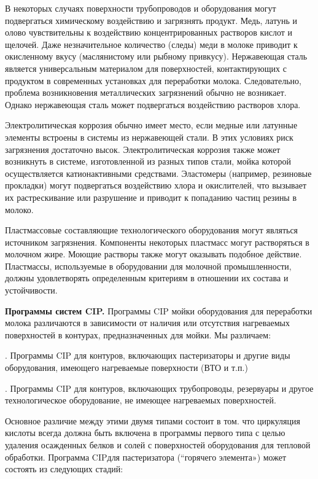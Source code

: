 {\par \redline В некоторых случаях поверхности трубопроводов и оборудования могут подвергаться химическому воздействию и загрязнять продукт. Медь, латунь и олово чувствительны к воздействию концентрированных растворов кислот и щелочей. Даже незначительное количество (следы) меди в молоке приводит к окисленному вкусу (маслянистому или рыбному привкусу). Нержавеющая сталь является универсальным материалом для поверхностей, контактирующих с продуктом в современных установках для переработки молока. Следовательно, проблема возникновения металлических загрязнений обычно не возникает. Однако нержавеющая сталь может подвергаться воздействию растворов хлора.

\par \redline Электролитическая коррозия обычно имеет место, если медные или латунные элементы встроены в системы из нержавеющей стали. В этих условиях риск загрязнения достаточно высок. Электролитическая коррозия также может возникнуть в системе, изготовленной из разных типов стали, мойка которой осуществляется катионактивными средствами. Эластомеры (например, резиновые прокладки) могут подвергаться воздействию хлора и окислителей, что вызывает их растрескивание или разрушение и приводит к попаданию частиц резины в молоко.



\par \redline Пластмассовые составляющие технологического оборудования могут являться источником загрязнения. Компоненты некоторых пластмасс могут растворяться в молочном жире. Моющие растворы также могут оказывать подобное действие. Пластмассы, используемые в оборудовании для молочной промышленности, должны удовлетворять определенным критериям в отношении их состава и устойчивости.


\par \redline \textbf{Программы систем CIP.} Программы CIP мойки оборудования для переработки молока различаются в зависимости от наличия или отсутствия нагреваемых поверхностей в контурах, предназначенных для мойки. Мы различаем:

\par {}. Программы CIP для контуров, включающих пастеризаторы и другие виды оборудования, имеющего нагреваемые поверхности (ВТО и т.п.)
\par {}. Программы CIP для контуров, включающих трубопроводы, резервуары и другое технологическое оборудование, не имеющее нагреваемых поверхностей.

\par \redline Основное различие между этими двумя типами состоит в том. что циркуляция кислоты всегда должна быть включена в программы первого типа с целью удаления осажденных белков и солей с поверхностей оборудования для тепловой обработки. Программа CIPдля пастеризатора (“горячего элемента») может состоять из следующих стадий:


}
